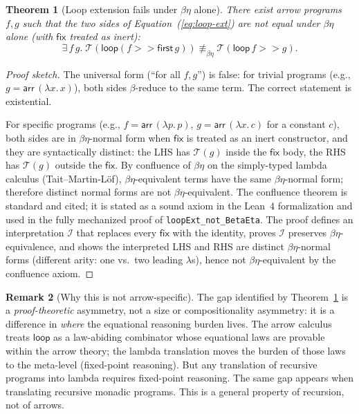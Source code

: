 \documentclass[11pt,a4paper]{article}
\newtheorem{theorem}{Theorem}
\theoremstyle{definition}
\newtheorem{remark}[theorem]{Remark}
\theoremstyle{remark}
\newcommand{\comp}{\mathbin{>\!\!>}}
\newcommand{\first}{\mathsf{first}}
\newcommand{\loopop}{\mathsf{loop}}
\newcommand{\fix}{\mathsf{fix}}
\newcommand{\T}{\mathcal{T}}
\newcommand{\interp}{\mathcal{I}}
\newcommand{\beteta}{\equiv_{\beta\eta}}
\begin{document}
\begin{theorem}[Loop extension fails under $\beta\eta$ alone]\label{thm:loop-no-beta}
There exist arrow programs $f, g$ such that the two sides of
Equation~(\ref{eq:loop-ext}) are \emph{not} equal under $\beta\eta$
alone (with $\fix$ treated as inert):
\[
  \exists\, f\, g.\; \T(\loopop(f \comp \first\,g)) \not\beteta \T(\loopop\,f \comp g).
\]
\end{theorem}

\begin{proof}[Proof sketch]
The universal form (``for all $f, g$'') is false: for trivial programs
(e.g., $g = \mathsf{arr}\,(\lambda x.\, x)$), both sides $\beta$-reduce
to the same term. The correct statement is existential.

For specific programs (e.g., $f = \mathsf{arr}\,(\lambda p.\, p)$,
$g = \mathsf{arr}\,(\lambda x.\, c)$ for a constant $c$), both sides
are in $\beta\eta$-normal form when $\fix$ is treated as an
inert constructor, and they are syntactically distinct: the LHS has
$\T(g)$ inside the $\fix$ body, the RHS has $\T(g)$ outside the $\fix$.
By confluence of $\beta\eta$ on the
simply-typed lambda calculus (Tait--Martin-L\"of), $\beta\eta$-equivalent
terms have the same $\beta\eta$-normal form; therefore distinct normal
forms are not $\beta\eta$-equivalent. The confluence theorem is standard
and cited; it is stated as a sound axiom in the Lean~4 formalization
and used in the fully mechanized proof of
\texttt{loopExt\_not\_BetaEta}. The proof defines an interpretation
$\interp$ that replaces every $\fix$ with the identity, proves
$\interp$ preserves $\beta\eta$-equivalence, and shows the interpreted
LHS and RHS are distinct $\beta\eta$-normal forms (different arity:
one vs.\ two leading $\lambda$s), hence not $\beta\eta$-equivalent by
the confluence axiom.
\end{proof}

\begin{remark}[Why this is not arrow-specific]
The gap identified by Theorem~\ref{thm:loop-no-beta} is a \emph{proof-theoretic}
asymmetry, not a size or compositionality asymmetry: it is a difference in
\emph{where} the equational reasoning burden lives. The arrow calculus
treats $\loopop$ as a law-abiding combinator whose equational laws are
provable within the arrow theory; the lambda translation moves the burden
of those laws to the meta-level (fixed-point reasoning). But any
translation of recursive programs into lambda requires fixed-point
reasoning. The same gap appears when translating recursive monadic
programs. This is a general property of recursion, not of arrows.
\end{remark}
\end{document}
